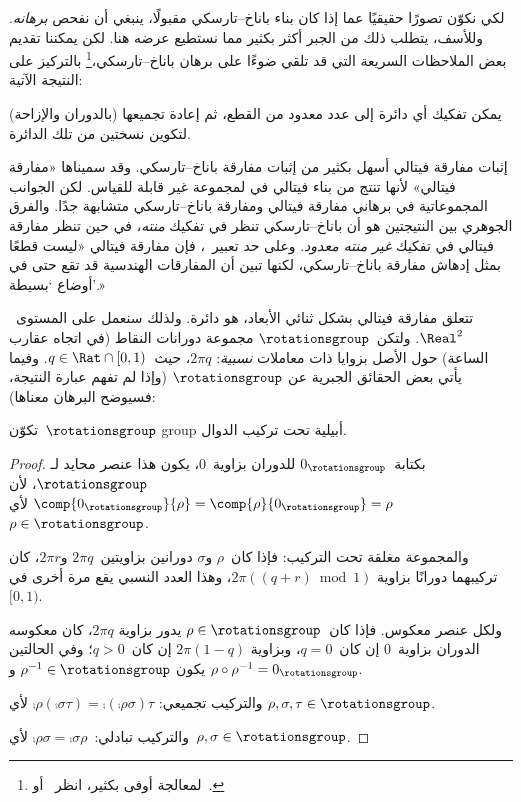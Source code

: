 \documentclass[../../../include/open-logic-section]{subfiles}
\begin{document}

لكي نكوّن تصورًا حقيقيًا عما إذا كان بناء باناخ--تارسكي مقبولًا،
ينبغي أن نفحص \emph{برهانه}. وللأسف، يتطلب ذلك من الجبر أكثر بكثير
مما نستطيع عرضه هنا. لكن يمكننا تقديم بعض الملاحظات السريعة التي قد
تلقي ضوءًا على برهان باناخ--تارسكي،\footnote{لمعالجة أوفى بكثير،
انظر~\cite{Weston2003} أو~\cite{Wagon2016}.} بالتركيز على النتيجة
الآتية:

\begin{thm}
يمكن تفكيك أي دائرة إلى عدد معدود من القطع، ثم إعادة تجميعها (بالدوران
والإزاحة) لتكوين نسختين من تلك الدائرة.
\end{thm}

إثبات مفارقة فيتالي أسهل بكثير من إثبات مفارقة باناخ--تارسكي. وقد
سميناها «مفارقة فيتالي» لأنها تنتج من بناء فيتالي في
\citeyear{Vitali1905} لمجموعة غير قابلة للقياس. لكن الجوانب
المجموعاتية في برهاني مفارقة فيتالي ومفارقة باناخ--تارسكي متشابهة
جدًا. والفرق الجوهري بين النتيجتين هو أن باناخ--تارسكي تنظر في تفكيك
\emph{منته}، في حين تنظر مفارقة فيتالي في تفكيك \emph{غير منته
معدود}. وعلى حد تعبير~\citet{Weston2003}، فإن مفارقة فيتالي «ليست
قطعًا بمثل إدهاش مفارقة باناخ--تارسكي، لكنها تبين أن المفارقات
الهندسية قد تقع حتى في أوضاع `بسيطة'.»

تتعلق مفارقة فيتالي بشكل ثنائي الأبعاد، هو دائرة. ولذلك سنعمل على
المستوى~$\Real^2$. ولتكن~$\rotationsgroup$ مجموعة دورانات النقاط (في
اتجاه عقارب الساعة) حول الأصل بزوايا ذات معاملات \emph{نسبية}:
$2\pi q$، حيث~$q \in \Rat \cap [0,1)$. وفيما يأتي بعض الحقائق الجبرية عن
$\rotationsgroup$ (وإذا لم تفهم عبارة النتيجة، فسيوضح البرهان معناها):

\begin{lem}
تكوّن~$\rotationsgroup$ {group} أبيلية تحت تركيب الدوال.
\end{lem}

\begin{proof}
بكتابة~$0_{\rotationsgroup}$ للدوران بزاوية~$0$، يكون هذا عنصر محايد
لـ$\rotationsgroup$، لأن
$\comp{0_{\rotationsgroup}}{\rho} = \comp{\rho}{0_{\rotationsgroup}} =
\rho$ لأي~$\rho \in \rotationsgroup$.

والمجموعة مغلقة تحت التركيب: فإذا كان~$\rho$ و$\sigma$ دورانين
بزاويتين~$2\pi q$ و$2\pi r$، كان تركيبهما دورانًا بزاوية
$2\pi((q+r) \bmod 1)$، وهذا العدد النسبي يقع مرة أخرى في~$[0,1)$.

ولكل عنصر معكوس. فإذا كان~$\rho \in \rotationsgroup$ يدور بزاوية
$2\pi q$، كان معكوسه الدوران بزاوية~$0$ إن كان~$q=0$، وبزاوية
$2\pi(1-q)$ إن كان~$q>0$؛ وفي الحالتين يكون
$\rho^{-1} \in \rotationsgroup$ و
$\rho \circ \rho^{-1} = 0_\rotationsgroup$.

والتركيب تجميعي:
$\comp{\rho}{(\comp{\sigma}{\tau})} =
\comp{(\comp{\rho}{\sigma})}{\tau}$ لأي
$\rho, \sigma, \tau \in \rotationsgroup$.

والتركيب تبادلي:~$\comp{\rho}{\sigma} =
\comp{\sigma}{\rho}$ لأي~$\rho, \sigma \in \rotationsgroup$.
\end{proof}
\end{document}
